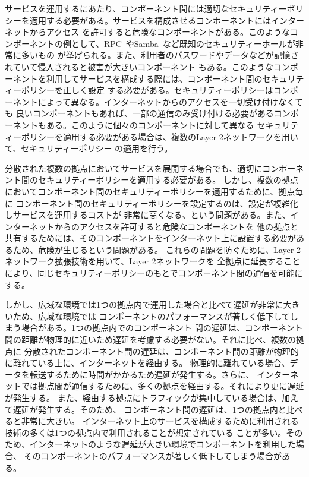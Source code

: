 サービスを運用するにあたり、コンポーネント間には適切なセキュリティーポリシーを適用する必要がある。サービスを構成させるコンポーネントにはインターネットからアクセス
を許可すると危険なコンポーネントがある。このようなコンポーネントの例として、RPC~\cite{rfc:rpc}やSamba~\cite{id:cifs}など既知のセキュリティーホールが非常に多いもの
が挙げられる。また、利用者のパスワードやデータなどが記憶されていて侵入されると被害が大きいコンポーネント
もある。このようなコンポーネントを利用してサービスを構成する際には、コンポーネント間のセキュリティーポリシーを正しく設定
する必要がある。セキュリティーポリシーはコンポーネントによって異なる。インターネットからのアクセスを一切受け付けなくても
良いコンポーネントもあれば、一部の通信のみ受け付ける必要があるコンポーネントもある。このように個々のコンポーネントに対して異なる
セキュリティーポリシーを適用する必要がある場合は、複数のLayer 2ネットワークを用いて、セキュリティーポリシー
の適用を行う。

分散された複数の拠点においてサービスを展開する場合でも、適切にコンポーネント間のセキュリティーポリシーを適用する必要がある。
しかし、複数の拠点においてコンポーネント間のセキュリティーポリシーを適用するために、拠点毎に
コンポーネント間のセキュリティーポリシーを設定するのは、設定が複雑化しサービスを運用するコストが
非常に高くなる、という問題がある。また、インターネットからのアクセスを許可すると危険なコンポーネントを
他の拠点と共有するためには、そのコンポーネントをインターネット上に設置する必要があるため、危険が生じるという問題がある。
これらの問題を防ぐために、Layer 2ネットワーク拡張技術を用いて、Layer 2ネットワークを
全拠点に延長することにより、同じセキュリティーポリシーのもとでコンポーネント間の通信を可能にする。

しかし、広域な環境では1つの拠点内で運用した場合と比べて遅延が非常に大きいため、広域な環境では
コンポーネントのパフォーマンスが著しく低下してしまう場合がある。1つの拠点内でのコンポーネント
間の遅延は、コンポーネント間の距離が物理的に近いため遅延を考慮する必要がない。それに比べ、複数の拠点に
分散されたコンポーネント間の遅延は、コンポーネント間の距離が物理的に離れている上に、インターネットを経由する。
物理的に離れている場合、データを転送するために時間がかかるため遅延が発生する。さらに、
インターネットでは拠点間が通信するために、多くの拠点を経由する。それにより更に遅延が発生する。
また、経由する拠点にトラフィックが集中している場合は、加えて遅延が発生する。そのため、
コンポーネント間の遅延は、1つの拠点内と比べると非常に大きい。
インターネット上のサービスを構成するために利用される技術の多くは1つの拠点内で利用されることが想定されている
ことが多い。そのため、インターネットのような遅延が大きい環境でコンポーネントを利用した場合、
そのコンポーネントのパフォーマンスが著しく低下してしまう場合がある。

